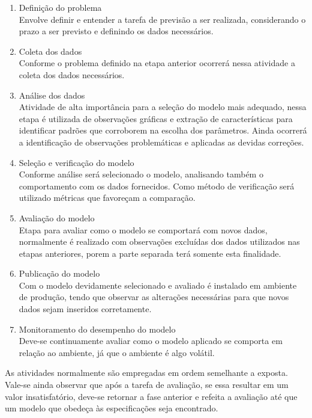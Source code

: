 \documentclass[
    12pt,
    oneside,
    a4paper,
    english,
    brazil
]{abntex2}
\begin{document}
\begin{enumerate}
    \item Definição do problema\\
        Envolve definir e entender a tarefa de previsão a ser realizada,
        considerando o prazo a ser previsto e definindo os dados necessários.
    \item Coleta dos dados\\
        Conforme o problema definido na etapa anterior ocorrerá nessa atividade
        a coleta dos dados necessários.
    \item Análise dos dados\\
        Atividade de alta importância para a seleção do modelo mais adequado,
        nessa etapa é utilizada de observações gráficas e extração de
        características para identificar padrões que corroborem na escolha dos
        parâmetros. Ainda ocorrerá a identificação de observações problemáticas
        e aplicadas as devidas correções.
    \item Seleção e verificação do modelo\\
        Conforme análise será selecionado o modelo, analisando também o
        comportamento com os dados fornecidos. Como método de verificação será
        utilizado métricas que favoreçam a comparação.
    \item Avaliação do modelo\\
        Etapa para avaliar como o modelo se comportará com novos dados,
        normalmente é realizado com observações excluídas dos dados utilizados
        nas etapas anteriores, porem a parte separada terá somente esta
        finalidade.
    \item Publicação do modelo\\
        Com o modelo devidamente selecionado e avaliado é instalado em ambiente
        de produção, tendo que observar as alterações necessárias para que
        novos dados sejam inseridos corretamente.
    \item Monitoramento do desempenho do modelo\\
        Deve-se continuamente avaliar como o modelo aplicado se comporta em
        relação ao ambiente, já que o ambiente é algo volátil.
\end{enumerate}

As atividades normalmente são empregadas em ordem semelhante a exposta. Vale-se
ainda observar que após a tarefa de avaliação, se essa resultar em um valor
insatisfatório, deve-se retornar a fase anterior e refeita a avaliação até que
um modelo que obedeça às especificações seja encontrado.
\end{document}
